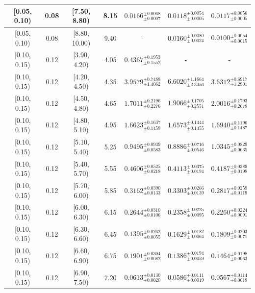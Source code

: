 \begin{longtable}{|c|c|c|c|c|c|c|}
\hline
[0.05, 0.10) & 0.08 & [7.50, 8.80) & 8.15 & $0.0166^{ \pm 0.0068 }_{ \pm 0.0007 }$ & $0.0118^{ \pm 0.0054 }_{ \pm 0.0005 }$ & $0.0117^{ \pm 0.0056 }_{ \pm 0.0005 }$ \\ 
\hline
[0.05, 0.10) & 0.08 & [8.80, 10.00) & 9.40 & - & $0.0160^{ \pm 0.0080 }_{ \pm 0.0024 }$ & $0.0100^{ \pm 0.0054 }_{ \pm 0.0015 }$ \\ 
\hline
[0.10, 0.15) & 0.12 & [3.90, 4.20) & 4.05 & $0.4367^{ \pm 0.1953 }_{ \pm 0.1552 }$ & - & - \\ 
\hline
[0.10, 0.15) & 0.12 & [4.20, 4.50) & 4.35 & $3.9579^{ \pm 0.7488 }_{ \pm 1.4062 }$ & $6.6020^{ \pm 1.1664 }_{ \pm 2.3456 }$ & $3.6312^{ \pm 0.6917 }_{ \pm 1.2901 }$ \\ 
\hline
[0.10, 0.15) & 0.12 & [4.50, 4.80) & 4.65 & $1.7011^{ \pm 0.2196 }_{ \pm 0.2276 }$ & $1.9066^{ \pm 0.1705 }_{ \pm 0.2551 }$ & $2.0016^{ \pm 0.1793 }_{ \pm 0.2678 }$ \\ 
\hline
[0.10, 0.15) & 0.12 & [4.80, 5.10) & 4.95 & $1.6623^{ \pm 0.1637 }_{ \pm 0.1459 }$ & $1.6573^{ \pm 0.1444 }_{ \pm 0.1455 }$ & $1.6940^{ \pm 0.1196 }_{ \pm 0.1487 }$ \\ 
\hline
[0.10, 0.15) & 0.12 & [5.10, 5.40) & 5.25 & $0.9495^{ \pm 0.0939 }_{ \pm 0.0583 }$ & $0.8886^{ \pm 0.0716 }_{ \pm 0.0546 }$ & $1.0345^{ \pm 0.0829 }_{ \pm 0.0635 }$ \\ 
\hline
[0.10, 0.15) & 0.12 & [5.40, 5.70) & 5.55 & $0.4606^{ \pm 0.0525 }_{ \pm 0.0218 }$ & $0.4113^{ \pm 0.0375 }_{ \pm 0.0194 }$ & $0.4187^{ \pm 0.0389 }_{ \pm 0.0198 }$ \\ 
\hline
[0.10, 0.15) & 0.12 & [5.70, 6.00) & 5.85 & $0.3162^{ \pm 0.0390 }_{ \pm 0.0133 }$ & $0.3303^{ \pm 0.0266 }_{ \pm 0.0139 }$ & $0.2817^{ \pm 0.0259 }_{ \pm 0.0119 }$ \\ 
\hline
[0.10, 0.15) & 0.12 & [6.00, 6.30) & 6.15 & $0.2644^{ \pm 0.0310 }_{ \pm 0.0106 }$ & $0.2358^{ \pm 0.0225 }_{ \pm 0.0095 }$ & $0.2260^{ \pm 0.0224 }_{ \pm 0.0091 }$ \\ 
\hline
[0.10, 0.15) & 0.12 & [6.30, 6.60) & 6.45 & $0.1395^{ \pm 0.0262 }_{ \pm 0.0055 }$ & $0.1629^{ \pm 0.0182 }_{ \pm 0.0064 }$ & $0.1809^{ \pm 0.0203 }_{ \pm 0.0071 }$ \\ 
\hline
[0.10, 0.15) & 0.12 & [6.60, 6.90) & 6.75 & $0.1901^{ \pm 0.0304 }_{ \pm 0.0082 }$ & $0.1386^{ \pm 0.0194 }_{ \pm 0.0059 }$ & $0.1464^{ \pm 0.0198 }_{ \pm 0.0063 }$ \\ 
\hline
[0.10, 0.15) & 0.12 & [6.90, 7.50) & 7.20 & $0.0613^{ \pm 0.0130 }_{ \pm 0.0020 }$ & $0.0586^{ \pm 0.0111 }_{ \pm 0.0019 }$ & $0.0567^{ \pm 0.0114 }_{ \pm 0.0018 }$ \\ 

\end{longtable}

